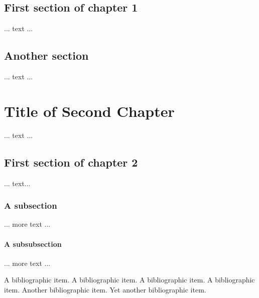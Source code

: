 \documentclass[12pt]{template/nuthesis}
\begin{document}
\section{First section of chapter 1}
	... text ...		%
\section{Another section}	%
	... text ...		%

\chapter{Title of Second Chapter}	%

	... text ...

\section{First section of chapter 2}

	... text...

\subsection{A subsection}

	... more text ...

\subsubsection{A subsubsection}

	... more text ...



%

%


%
\begin{singlespace}
\clearpage{} %
\begin{thebibliography}{xxx}

 A bibliographic item.  A bibliographic item.  A
bibliographic item.  A bibliographic item.
 Another bibliographic item.  
 Yet another bibliographic item.  
\end{thebibliography}
\end{singlespace}
\end{document}
